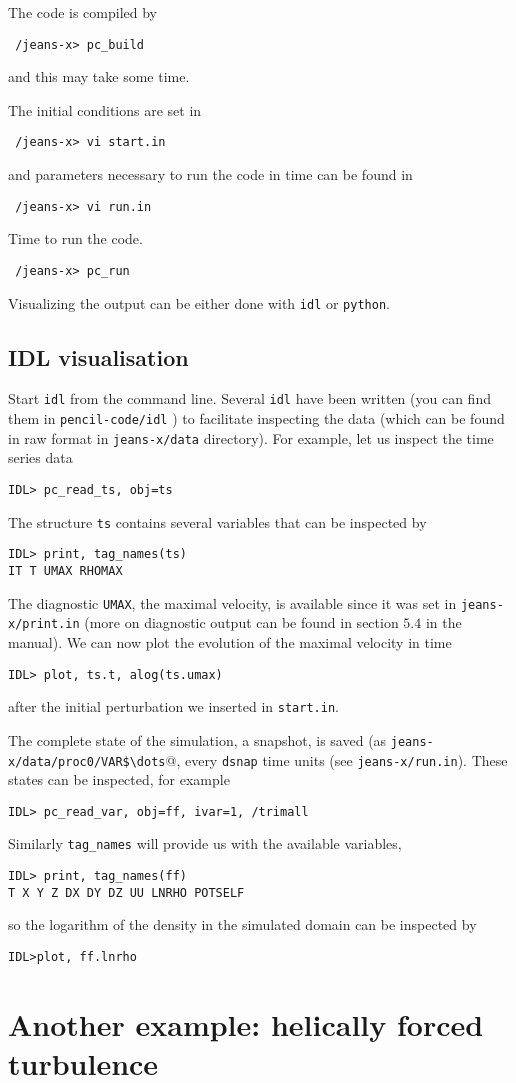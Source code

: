 \documentclass[a4paper,12pt]{article}
\begin{document}
The code is compiled by
\begin{verbatim}
 /jeans-x> pc_build
\end{verbatim}
and this may take some time.

The initial conditions are set in
\begin{verbatim}
 /jeans-x> vi start.in
\end{verbatim}

and parameters necessary to run the code in time can be found in
\begin{verbatim}
 /jeans-x> vi run.in
\end{verbatim}

Time to run the code. 
\begin{verbatim}
 /jeans-x> pc_run
\end{verbatim}

Visualizing the output can be either done with \verb|idl| or \verb|python|.

\subsection{IDL visualisation}

Start \verb|idl| from the command line. Several \verb|idl| have been written
(you can find them in \verb|pencil-code/idl| ) to facilitate inspecting the data
(which can be found in raw format in \verb|jeans-x/data| directory).  For
example, let us inspect the time series data
\begin{verbatim}
IDL> pc_read_ts, obj=ts
\end{verbatim}
The structure \verb|ts| contains several variables that can be inspected by
\begin{verbatim}
IDL> print, tag_names(ts)
IT T UMAX RHOMAX
\end{verbatim}
The diagnostic \verb|UMAX|, the maximal velocity, is available since it was set
in \verb|jeans-x/print.in| (more on diagnostic output can be found in section
$5.4$ in the manual).  We can now plot the evolution of the maximal velocity in
time
\begin{verbatim}
IDL> plot, ts.t, alog(ts.umax)
\end{verbatim}
after the initial perturbation we inserted in \verb|start.in|.

The complete state of the simulation, a snapshot, is saved (as
\verb|jeans-x/data/proc0/VAR$\dots|@, every \verb|dsnap|
time units
(see \verb|jeans-x/run.in|). These states can be inspected, for example
\begin{verbatim}
IDL> pc_read_var, obj=ff, ivar=1, /trimall
\end{verbatim}
Similarly \verb|tag_names| will provide us with the available variables, 
\begin{verbatim}
IDL> print, tag_names(ff)
T X Y Z DX DY DZ UU LNRHO POTSELF
\end{verbatim}
so the logarithm of the density in the simulated domain can be inspected by
\begin{verbatim}
IDL>plot, ff.lnrho
\end{verbatim}


\section{Another example: helically forced turbulence}


\end{document}
